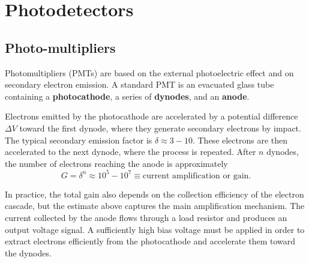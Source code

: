 \section{Photodetectors}\label{sec:photodetectors}
\subsection{Photo-multipliers}
Photomultipliers (PMTs) are based on the external photoelectric effect and on secondary electron emission. A standard PMT is an evacuated glass tube containing a \textbf{photocathode}, a series of \textbf{dynodes}, and an \textbf{anode}.

Electrons emitted by the photocathode are accelerated by a potential difference $\Delta V$ toward the first dynode, where they generate secondary electrons by impact. The typical secondary emission factor is $\delta \approx 3-10$. These electrons are then accelerated to the next dynode, where the process is repeated. After $n$ dynodes, the number of electrons reaching the anode is approximately
\[
G = \delta^n \approx 10^5-10^7 \equiv \text{current amplification or gain}.
\]

In practice, the total gain also depends on the collection efficiency of the electron cascade, but the estimate above captures the main amplification mechanism. The current collected by the anode flows through a load resistor and produces an output voltage signal.
A sufficiently high bias voltage must be applied in order to extract electrons efficiently from the photocathode and accelerate them toward the dynodes.

